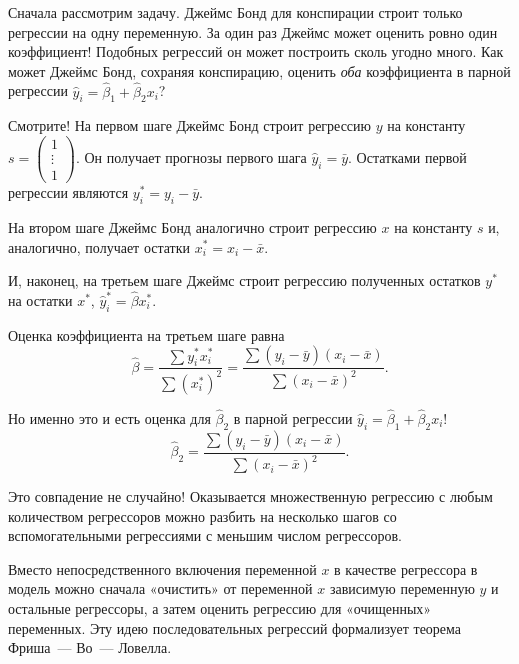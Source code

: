 \documentclass[12pt]{article}
\newcommand{\hb}{\hat{\beta}}
\newcommand{\hy}{\hat{y}}
\begin{document}

Сначала рассмотрим задачу. 
Джеймс Бонд для конспирации строит только регрессии на одну переменную. 
За один раз Джеймс может оценить ровно один коэффициент!
Подобных регрессий он может построить сколь угодно много.
Как может Джеймс Бонд, сохраняя конспирацию, оценить \emph{оба} коэффициента в парной регрессии $\hy_i = \hb_1 + \hb_2 x_i$?

Смотрите! На первом шаге Джеймс Бонд строит регрессию $y$ на константу $s = \begin{pmatrix}
    1 \\
    \vdots \\
    1 
\end{pmatrix}$. 
Он получает прогнозы первого шага $\hy_i = \bar y$.
Остатками первой регрессии являются $y^*_i = y_i - \bar y$.

На втором шаге Джеймс Бонд аналогично строит регрессию $x$ на константу $s$ и, аналогично, получает остатки $x^*_i = x_i - \bar x$.

И, наконец, на третьем шаге Джеймс строит регрессию полученных остатков $y^*$ на остатки $x^*$,
$\hat y^*_i = \hb x^*_i$.

Оценка коэффициента на третьем шаге равна
\[
\hb = \frac{\sum y_i^* x_i^*}{\sum(x_i^*)^2} = \frac{\sum (y_i - \bar y)(x_i - \bar x)}{\sum (x_i - \bar x)^2}.
\]

Но именно это и есть оценка для $\hb_2$ в парной регрессии $\hy_i = \hb_1 + \hb_2 x_i$!
\[
\hb_2 = \frac{\sum (y_i - \bar y)(x_i - \bar x)}{\sum (x_i - \bar x)^2}.
\]

Это совпадение не случайно! 
Оказывается множественную регрессию с любым количеством регрессоров можно разбить на несколько шагов со вспомогательными регрессиями с меньшим числом регрессоров. 

Вместо непосредственного включения переменной $x$ в качестве регрессора в модель можно сначала «очистить» от переменной $x$ зависимую переменную $y$ и остальные регрессоры,
а затем оценить регрессию для «очищенных» переменных.
Эту идею последовательных регрессий формализует теорема Фриша~— Во~— Ловелла.
\end{document}
